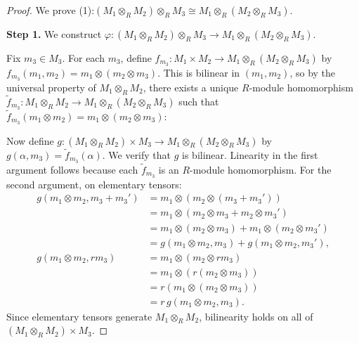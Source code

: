 \begin{proof}
    We prove (1):$(M_1 \otimes_R M_2) \otimes_R M_3 \cong M_1 \otimes_R (M_2 \otimes_R M_3)$.

    \textbf{Step 1.} We construct $\varphi: (M_1 \otimes_R M_2) \otimes_R M_3 \to M_1 \otimes_R (M_2 \otimes_R M_3)$.

    Fix $m_3 \in M_3$. For each $m_3$, define $f_{m_3}: M_1 \times M_2 \to M_1 \otimes_R (M_2 \otimes_R M_3)$ by $f_{m_3}(m_1, m_2) = m_1 \otimes (m_2 \otimes m_3)$. This is bilinear in $(m_1, m_2)$, so by the universal property of $M_1 \otimes_R M_2$, there exists a unique $R$-module homomorphism $\tilde{f}_{m_3}: M_1 \otimes_R M_2 \to M_1 \otimes_R (M_2 \otimes_R M_3)$ such that $\tilde{f}_{m_3}(m_1 \otimes m_2) = m_1 \otimes (m_2 \otimes m_3)$:
    \begin{center}
    \end{center}

    Now define $g: (M_1 \otimes_R M_2) \times M_3 \to M_1 \otimes_R (M_2 \otimes_R M_3)$ by $g(\alpha, m_3) = \tilde{f}_{m_3}(\alpha)$. We verify that $g$ is bilinear. Linearity in the first argument follows because each $\tilde{f}_{m_3}$ is an $R$-module homomorphism. For the second argument, on elementary tensors:
    \begin{align*}
        g(m_1 \otimes m_2, m_3 + m_3') & = m_1 \otimes (m_2 \otimes (m_3+m_3'))                           \\
                                       & = m_1 \otimes (m_2 \otimes m_3 + m_2 \otimes m_3')               \\
                                       & = m_1 \otimes (m_2 \otimes m_3) + m_1 \otimes (m_2 \otimes m_3') \\
                                       & = g(m_1 \otimes m_2, m_3) + g(m_1 \otimes m_2, m_3'),            \\
        g(m_1 \otimes m_2, rm_3)       & = m_1 \otimes (m_2 \otimes rm_3)                                 \\
                                       & = m_1 \otimes (r(m_2 \otimes m_3))                               \\
                                       & = r(m_1 \otimes (m_2 \otimes m_3))                               \\
                                       & = r\, g(m_1 \otimes m_2, m_3).
    \end{align*}
    Since elementary tensors generate $M_1 \otimes_R M_2$, bilinearity holds on all of $(M_1 \otimes_R M_2) \times M_3$.


\end{proof}
